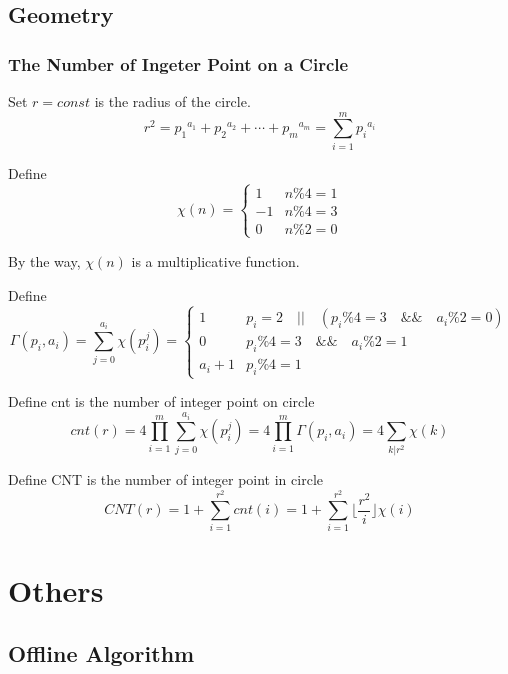 \documentclass[10pt]{ctexart}
\begin{document}
{{\subsection{Geometry}
\subsubsection{The Number of Ingeter Point on a Circle}
Set $r = const$ is the radius of the circle.
$$r^2 = {p_1}^{a_1} + {p_2}^{a_2} + \cdots + {p_m}^{a_m} = \sum_{i = 1}^{m} {p_i}^{a_i}$$
\par 
Define
\[
    \chi(n)=
    \begin{cases}
        1 & {n \% 4 = 1} \\
        -1 & {n \% 4 = 3} \\
        0 & {n \% 2 = 0}
    \end{cases}
\]
\par
By the way, $\chi(n)$ is a multiplicative function. 
\par
Define
\[
    \Gamma(p_i,a_i)=\sum_{j = 0}^{a_i}\chi(p_i^j)=
    \begin{cases}
        1 & {p_i = 2 \quad || \quad (p_i \% 4 = 3 \quad \&\& \quad a_i \% 2 = 0)} \\
        0 & {p_i \% 4 = 3 \quad \&\& \quad a_i \% 2 = 1} \\
        a_i + 1 & {p_i \% 4 = 1}
    \end{cases}
\]
\par
Define cnt is the number of integer point on circle
$$cnt(r) = 4 \prod_{i = 1}^{m} \sum_{j = 0}^{a_i} \chi(p_i^j) = 4 \prod_{i = 1}^{m} \Gamma(p_i,a_i) = 4 \sum_{k | r^2}\chi(k)$$
\par
Define CNT is the number of integer point in circle
$$CNT(r) = 1 + \sum_{i = 1}^{r^2}cnt(i) = 1 + \sum_{i = 1}^{r^2} \lfloor \frac{r^2}{i} \rfloor \chi(i)$$





\newpage
\section{Others}
\subsection{Offline Algorithm}
}}
\end{document}
